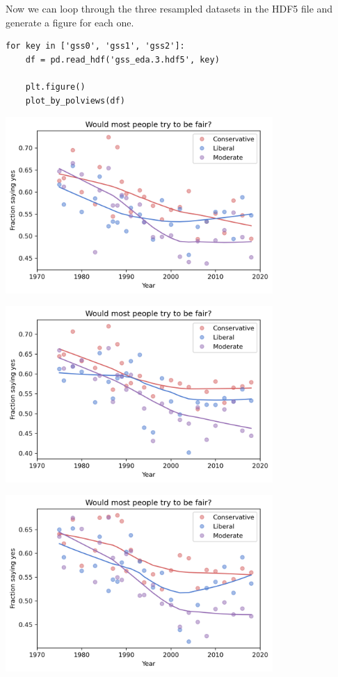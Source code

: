 Now we can loop through the three resampled datasets in the HDF5 file
and generate a figure for each one.

\begin{lstlisting}[]
for key in ['gss0', 'gss1', 'gss2']:
    df = pd.read_hdf('gss_eda.3.hdf5', key)

    plt.figure()
    plot_by_polviews(df)
\end{lstlisting}

\begin{center}
\includegraphics[width=4in]{chapters/03_outlook_files/03_outlook_60_0.png}
\end{center}

\begin{center}
\includegraphics[width=4in]{chapters/03_outlook_files/03_outlook_60_1.png}
\end{center}

\begin{center}
\includegraphics[width=4in]{chapters/03_outlook_files/03_outlook_60_2.png}
\end{center}

